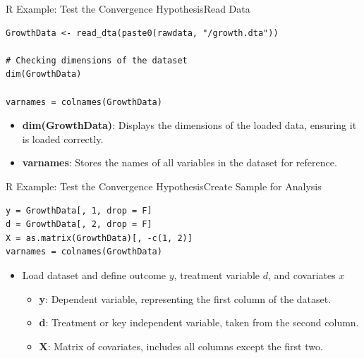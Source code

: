 \documentclass[dvipsnames,hyperref={pdfpagelabels=false}]{beamer}
\begin{document}
\begin{frame}[fragile]{R Example: Test the Convergence Hypothesis}{Read Data}
\begin{lstlisting}
GrowthData <- read_dta(paste0(rawdata, "/growth.dta"))

# Checking dimensions of the dataset
dim(GrowthData)

varnames = colnames(GrowthData)
\end{lstlisting}
	\begin{itemize}
		\item \textbf{dim(GrowthData)}: Displays the dimensions of the loaded data, ensuring it is loaded correctly.
		
		\vspace{0.2cm}
		
		\item \textbf{varnames}: Stores the names of all variables in the dataset for reference.
		
	\end{itemize}
\end{frame}






\begin{frame}[fragile]{R Example: Test the Convergence Hypothesis}{Create Sample for Analysis}
\begin{lstlisting}
y = GrowthData[, 1, drop = F]
d = GrowthData[, 2, drop = F]
X = as.matrix(GrowthData)[, -c(1, 2)]
varnames = colnames(GrowthData)
\end{lstlisting}
	\begin{itemize}
		\item Load dataset and define outcome $y$, treatment variable $d$, and covariates $x$
		\begin{itemize}
			\vspace{0.2cm}
			\item \textbf{y}: Dependent variable, representing the first column of the dataset.
			\vspace{0.2cm}
			\item \textbf{d}: Treatment or key independent variable, taken from the second column.
			\vspace{0.2cm}
			\item \textbf{X}: Matrix of covariates, includes all columns except the first two.
		\end{itemize}
		
		
	\end{itemize}
\end{frame}
\end{document}

